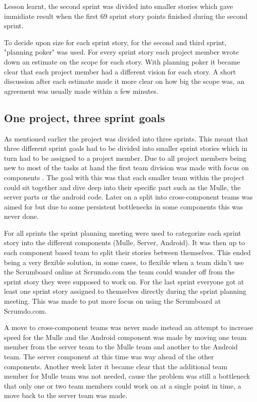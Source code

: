 Lesson learnt, the second sprint was divided into smaller stories which gave immidiate result when the first 69 sprint story points finished during the second sprint.

To decide upon size for each sprint story, for the second and third sprint, "planning poker" \cite[p.~42]{kniberg07} was used.
For every sprint story each project member wrote down an estimate on the scope for each story.
With planning poker it became clear that each project member had a different vision for each story.
A short discussion after each estimate made it more clear on how big the scope was, an agreement was usually made within a few minutes.

%
%
\subsection{One project, three sprint goals}
As mentioned earlier the project was divided into three sprints.
This meant that three different sprint goals had to be divided into smaller sprint stories which in turn had to be assigned to a project member.
Due to all project members being new to most of the tasks at hand the first team division was made with focus on components \cite[p.~106]{kniberg07}.
The goal with this was that each smaller team within the project could sit together and dive deep into their specific part such as the Mulle, the server parts or the android code.
Later on a split into cross-component teams \cite[p.~107]{kniberg07} was aimed for but due to some persistent bottlenecks in some components this was never done.

For all sprints the sprint planning meeting were used to categorize each sprint story into the different components (Mulle, Server, Android).
It was then up to each component based team to split their stories between themselves.
This ended being a very flexible solution, in some cases, to flexible when a team didn't use the Scrumboard online at Scrumdo.com the team could wander off from the sprint story they were supposed to work on.
For the last sprint everyone got at least one sprint story assigned to themselves directly during the sprint planning meeting.
This was made to put more focus on using the Scrumboard at Scrumdo.com.

A move to cross-component teams was never made instead an attempt to increase speed for the Mulle and the Android component was made by moving one team member from the server team to the Mulle team and another to the Android team.
The server component at this time was way ahead of the other components.
Another week later it became clear that the additional team member for Mulle team was not needed, cause the problem was still a bottleneck that only one or two team members could work on at a single point in time, a move back to the server team was made.

